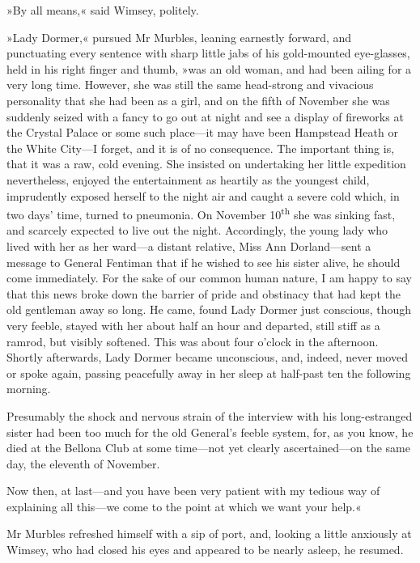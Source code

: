 »By all means,« said Wimsey, politely.

»Lady Dormer,« pursued Mr Murbles, leaning earnestly forward, and punctuating every sentence with sharp little jabs of his gold-mounted eye-glasses, held in his right finger and thumb, »was an old woman, and had been ailing for a very long time. However, she was still the same head-strong and vivacious personality that she had been as a girl, and on the fifth of November she was suddenly seized with a fancy to go out at night and see a display of fireworks at the Crystal Palace or some such place—it may have been Hampstead Heath or the White City—I forget, and it is of no consequence. The important thing is, that it was a raw, cold evening. She insisted on undertaking her little expedition nevertheless, enjoyed the entertainment as heartily as the youngest child, imprudently exposed herself to the night air and caught a severe cold which, in two days' time, turned to pneumonia. On November  10\textsuperscript{th} she was sinking fast, and scarcely expected to live out the night. Accordingly, the young lady who lived with her as her ward—a distant relative, Miss Ann Dorland—sent a message to General Fentiman that if he wished to see his sister alive, he should come immediately. For the sake of our common human nature, I am happy to say that this news broke down the barrier of pride and obstinacy that had kept the old gentleman away so long. He came, found Lady Dormer just conscious, though very feeble, stayed with her about half an hour and departed, still stiff as a ramrod, but visibly softened. This was about four o'clock in the afternoon. Shortly afterwards, Lady Dormer became unconscious, and, indeed, never moved or spoke again, passing peacefully away in her sleep at half-past ten the following morning.

Presumably the shock and nervous strain of the interview with his long-estranged sister had been too much for the old General's feeble system, for, as you know, he died at the Bellona Club at some time—not yet clearly ascertained—on the same day, the eleventh of November.

Now then, at last—and you have been very patient with my tedious way of explaining all this—we come to the point at which we want your help.«

Mr Murbles refreshed himself with a sip of port, and, looking a little anxiously at Wimsey, who had closed his eyes and appeared to be nearly asleep, he resumed.

